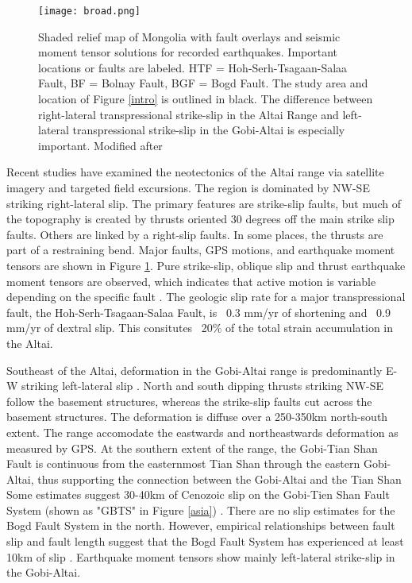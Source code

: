 \begin{figure}[h!]
	\centering
	\texttt{[image: broad.png]}
	\caption{Shaded relief map of Mongolia with fault overlays and seismic moment tensor solutions for recorded earthquakes. Important locations or faults are labeled. HTF = Hoh-Serh-Tsagaan-Salaa Fault, BF = Bolnay Fault, BGF = Bogd Fault. The study area and location of Figure \ref{intro} is outlined in black. The difference between right-lateral transpressional strike-slip in the Altai Range and left-lateral transpressional strike-slip in the Gobi-Altai is especially important. Modified after \citet{Calais2003}}
	\label{broad}
\end{figure}

	Recent studies have examined the neotectonics of the Altai range via satellite imagery and targeted field excursions\citep{Cunningham2005a}. The region is dominated by NW-SE striking right-lateral slip. The primary features are strike-slip faults, but much of the topography is created by thrusts oriented 30 degrees off the main strike slip faults. Others are linked by a right-slip faults. In some places, the thrusts are part of a restraining bend. Major faults, GPS motions, and earthquake moment tensors are shown in Figure \ref{broad}. Pure strike-slip, oblique slip and thrust earthquake moment tensors are observed, which indicates that active motion is variable depending on the specific fault \citep{Bayasgalan2005a}. The geologic slip rate for a major transpressional fault, the Hoh-Serh-Tsagaan-Salaa Fault, is ~0.3 mm/yr of shortening and ~0.9 mm/yr of dextral slip. This consitutes ~20\% of the total strain accumulation in the Altai. \citep{Frankel2010}

	Southeast of the Altai, deformation in the Gobi-Altai range is predominantly E-W striking left-lateral slip \citep{Cunningham2010}. North and south dipping thrusts striking NW-SE follow the basement structures, whereas the strike-slip faults cut across the basement structures. The deformation is diffuse over a 250-350km north-south extent. The range accomodate the eastwards and northeastwards deformation as measured by GPS. At the southern extent of the range, the Gobi-Tian Shan Fault is continuous from the easternmost Tian Shan through the eastern Gobi-Altai, thus supporting the connection between the Gobi-Altai and the Tian Shan Some estimates suggest 30-40km of Cenozoic slip on the Gobi-Tien Shan Fault System (shown as "GBTS" in Figure \ref{asia}) \citep{Cunningham2003a}. There are no slip estimates for the Bogd Fault System in the north. However, empirical relationships between fault slip and fault length suggest that the Bogd Fault System has experienced at least 10km of slip \citep{Cowie1992}.  Earthquake moment tensors show mainly left-lateral strike-slip in the Gobi-Altai. 

